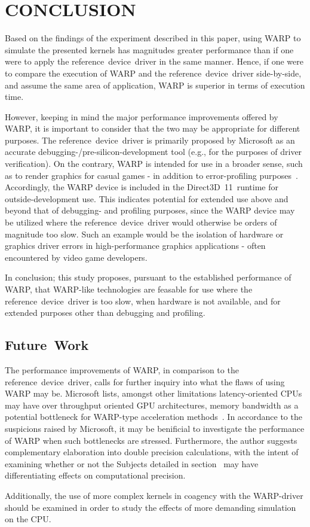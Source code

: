 
\section{CONCLUSION}
\label{sec:conclusion}
Based on the findings of the experiment described in this paper, using WARP to simulate the presented kernels has magnitudes greater performance than if one were to apply the reference~device~driver in the same manner.
Hence, if one were to compare the execution of WARP and the reference~device~driver side-by-side, and assume the same area of application, WARP is superior in terms of execution time.

However, keeping in mind the major performance improvements offered by WARP, it is important to consider that the two may be appropriate for different purposes.
The reference~device~driver is primarily proposed by Microsoft as an accurate debugging-/pre-silicon-development tool (e.g., for the purposes of driver verification).
On the contrary, WARP is intended for use in a broader sense, such as to render graphics for casual games - in addition to error-profiling purposes~.
Accordingly, the WARP device is included in the Direct3D~11~runtime for outside-development use.
This indicates potential for extended use above and beyond that of debugging- and profiling purposes, since the WARP device may be utilized where the reference~device~driver would otherwise be orders of magnitude too slow.
Such an example would be the isolation of hardware or graphics driver errors in high-performance graphics applications - often encountered by video game developers.

In conclusion; this study proposes, pursuant to the established performance of WARP, that WARP-like technologies are feasable for use where the reference~device~driver is too slow, when hardware is not available, and for extended purposes other than debugging and profiling.

\subsection{Future~Work}
\label{sec:conclusion:futurework}
The performance improvements of WARP, in comparison to the reference~device~driver, calls for further inquiry into what the flaws of using WARP may be.
Microsoft lists, amongst other limitations latency-oriented CPUs may have over throughput oriented GPU architectures, memory bandwidth as a potential bottleneck for WARP-type acceleration methods~.
In accordance to the suspicions raised by Microsoft, it may be benificial to investigate the performance of WARP when such bottlenecks are stressed.
Furthermore, the author suggests complementary elaboration into double precision calculations, with the intent of examining whether or not the Subjects detailed in section~ may have differentiating effects on computational precision.

Additionally, the use of more complex kernels in coagency with the WARP-driver should be examined in order to study the effects of more demanding simulation on the CPU.
